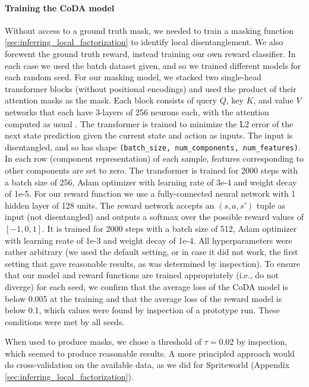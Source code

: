 \documentclass[coda.tex]{subfiles}
\begin{document}
\paragraph{Training the CoDA model}
Without access to a ground truth mask, we needed to train a masking function \ref{sec:inferring_local_factorization} to identify local disentanglement. We also forewent the ground truth reward, instead training our own reward classifier. In each case we used the batch dataset given, and so we trained different models for each random seed. For our masking model, we stacked two single-head transformer blocks (without positional encodings) and used the product of their attention masks as the mask. 
Each block consists of query $Q$, key $K$, and value $V$ networks that each have 3-layers of 256 neurons each, with the attention computed as usual \cite{vaswani2017attention,lee2018set}. 
The transformer is trained to minimize the L2 error of the next state prediction given the current state and action as inputs. 
The input is disentangled, and so has shape \texttt{(batch\_size, num\_components, num\_features)}. In each row (component representation) of each sample, features corresponding to other components are set to zero. 
The transformer is trained for 2000 steps with a batch size of 256, Adam optimizer \cite{kingma2014adam} with learning rate of 3e-4 and weight decay of 1e-5. 
For our reward function we use a fully-connected neural network with 1 hidden layer of 128 units. 
The reward network accepts an $(s, a, s')$ tuple as input (not disentangled) and outputs a softmax over the possible reward values of $[-1, 0, 1]$. 
It is trained for 2000 steps with a batch size of 512, Adam optimizer \cite{kingma2014adam} with learning reate of 1e-3 and weight decay of 1e-4. 
All hyperparameters were rather arbitrary (we used the default setting, or in case it did not work, the first setting that gave reasonable results, as was determined by inspection). 
To ensure that our model and reward functions are trained appropriately (i.e., do not diverge) for each seed, we confirm that the average loss of the CoDA model is below 0.005 at the training and that the average loss of the reward model is below 0.1, which values were found by inspection of a prototype run. These conditions were met by all seeds.

When used to produce masks, we chose a threshold of $\tau = 0.02$ by inspection, which seemed to produce reasonable results. A more principled approach would do cross-validation on the available data, as we did for Spriteworld (Appendix \ref{sec:inferring_local_factorization}). 
\end{document}
